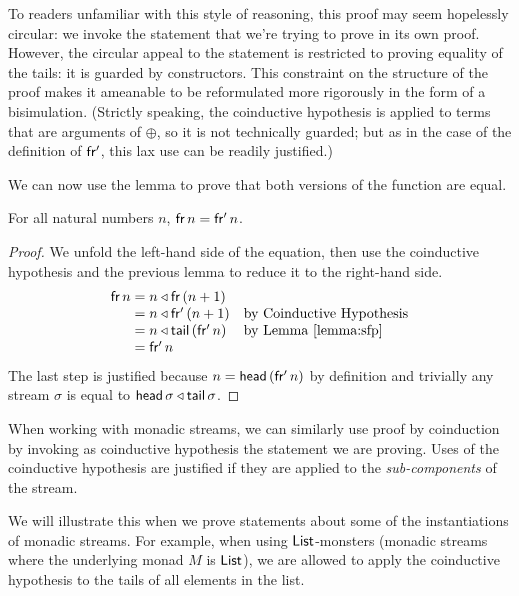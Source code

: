To readers unfamiliar with this style of reasoning, this proof may seem hopelessly circular: we invoke the statement that we're trying to prove in its own proof.
However, the circular appeal to the statement is restricted to proving equality of the tails: it is guarded by constructors. 
This constraint on the structure of the proof makes it ameanable to be reformulated more rigorously in the form of a bisimulation.
(Strictly speaking, the coinductive hypothesis is applied to terms that are arguments of $\oplus$, so it is not technically guarded; but as in the case of the definition of $\mathsf{fr'}$, this lax use can be readily justified.)

We can now use the lemma to prove that both versions of the function are equal.
\begin{theorem}
For all natural numbers $n$, $\mathsf{fr}\,n = \mathsf{fr'}\,n$.
\end{theorem}
\begin{proof}
We unfold the left-hand side of the equation, then use the coinductive hypothesis and the previous lemma to reduce it to the right-hand side.
$$
\begin{array}{r@{{}={}}ll}
\sfr\,n
& n \scons \sfr\,(n+1)\\
& n \scons \sfp\,(n+1) & \mbox{by Coinductive Hypothesis}\\
& n \scons \tail\,(\sfp\,n) & \mbox{by Lemma \ref{lemma:sfp}}\\
& \sfp\,n
\end{array}
$$
The last step is justified because $n = \mathsf{head}\,(\mathsf{fr'}\,n)$ by definition and trivially any stream $\sigma$ is equal to $\mathsf{head}\,\sigma \triangleleft \mathsf{tail}\,\sigma$.
\end{proof}

When working with monadic streams, we can similarly use proof by coinduction by invoking as coinductive hypothesis the statement we are proving.
Uses of the coinductive hypothesis are justified if they are applied to the {\em sub-components} of the stream.

We will illustrate this when we prove statements about some of the instantiations of monadic streams.
For example, when using $\mathsf{List}$-monsters (monadic streams where the underlying monad $M$ is $\mathsf{List}$), we are allowed to apply the coinductive hypothesis to the tails of all elements in the list.
